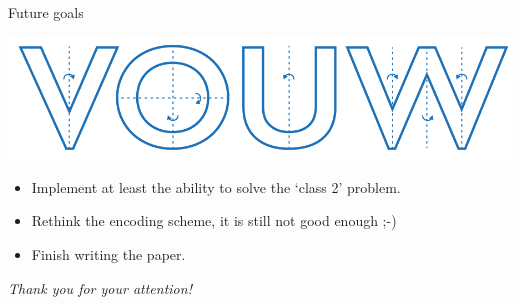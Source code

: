 \documentclass[11pt]{beamer}
\begin{document}

\begin{frame}{Future goals}

\begin{center}
\includegraphics[width=0.4\paperwidth]{"VOUW logo-02"} 
\end{center}

\begin{itemize}
\item Implement at least the ability to solve the `class 2' problem.
\item Rethink the encoding scheme, it is still not good enough ;-)
\item Finish writing the paper.
\end{itemize}\bigskip

\emph{Thank you for your attention!}

\end{frame}

\end{document}
